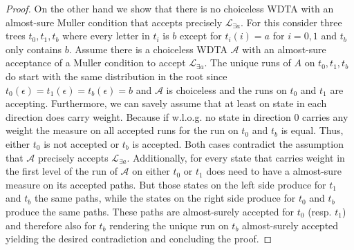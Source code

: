 \begin{proof}
  On the other hand we show that there is no choiceless \ac{WDTA} with an
  almost-sure Muller condition that accepts precisely $\mathcal{L}_{\exists a}$.
  For this consider three trees $t_{0}, t_{1}, t_{b}$ where every letter in
  $t_{i}$ is $b$ except for $t_{i}(i) = a$ for $i = 0,1$ and $t_{b}$ only
  contains $b$. Assume there is a choiceless \ac{WDTA} $\mathcal{A}$ with an
  almost-sure acceptance of a Muller condition to accept
  $\mathcal{L}_{\exists a}$. The unique runs of $A$ on $t_{0},t_{1}, t_{b}$ do
  start with the same distribution in the root since
  $t_{0}(\epsilon) = t_{1}(\epsilon) = t_{b}(\epsilon) = b$ and $\mathcal{A}$
  is choiceless and the runs on $t_{0}$ and $t_{1}$ are accepting.
  Furthermore, we can savely assume that at least on state in each direction
  does carry weight. Because if w.l.o.g. no state in direction $0$ carries any
  weight the measure on all accepted runs for the run on $t_{0}$ and $t_{b}$ is
  equal. Thus, either $t_{0}$ is not accepted or $t_{b}$ is accepted. Both
  cases contradict the assumption that $\mathcal{A}$ precisely accepts
  $\mathcal{L}_{\exists a}$. Additionally, for every state that carries weight
  in the first level of the run of $\mathcal{A}$ on either $t_{0}$ or $t_{1}$
  does need to have a almost-sure measure on its accepted paths. But those
  states on the left side produce for $t_{1}$ and $t_{b}$ the same paths, while
  the states on the right side produce for $t_{0}$ and $t_{b}$ produce the same
  paths. These paths are almost-surely accepted for $t_{0}$ (resp. $t_{1}$) and
  therefore also for $t_{b}$ rendering the unique run on $t_{b}$ almost-surely
  accepted yielding the desired contradiction and concluding the proof.
\end{proof}

